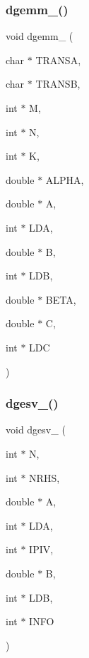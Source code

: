 \mbox{\label{a00476_a9840ce0aeb2a881e52fb96b7967c71e3}} 
\subsubsection{\texorpdfstring{dgemm\+\_\+()}{dgemm\_()}}
{\footnotesize\ttfamily void dgemm\+\_\+ (\begin{DoxyParamCaption}\item[{char $\ast$}]{T\+R\+A\+N\+SA,  }\item[{char $\ast$}]{T\+R\+A\+N\+SB,  }\item[{int $\ast$}]{M,  }\item[{int $\ast$}]{N,  }\item[{int $\ast$}]{K,  }\item[{double $\ast$}]{A\+L\+P\+HA,  }\item[{double $\ast$}]{A,  }\item[{int $\ast$}]{L\+DA,  }\item[{double $\ast$}]{B,  }\item[{int $\ast$}]{L\+DB,  }\item[{double $\ast$}]{B\+E\+TA,  }\item[{double $\ast$}]{C,  }\item[{int $\ast$}]{L\+DC }\end{DoxyParamCaption})}

\mbox{\label{a00476_a286edb8a8718c68dd5b7e73570b82a95}} 
\subsubsection{\texorpdfstring{dgesv\+\_\+()}{dgesv\_()}}
{\footnotesize\ttfamily void dgesv\+\_\+ (\begin{DoxyParamCaption}\item[{int $\ast$}]{N,  }\item[{int $\ast$}]{N\+R\+HS,  }\item[{double $\ast$}]{A,  }\item[{int $\ast$}]{L\+DA,  }\item[{int $\ast$}]{I\+P\+IV,  }\item[{double $\ast$}]{B,  }\item[{int $\ast$}]{L\+DB,  }\item[{int $\ast$}]{I\+N\+FO }\end{DoxyParamCaption})}

